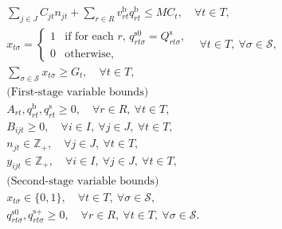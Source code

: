 \begin{subequations}
\begin{align}
	&\sum_{j\in J}C_{jt}n_{jt}+\sum_{r\in R}v_{rt}^\textrm{b}q_{rt}^\textrm{b}\le MC_t,\quad\forall t\in T,\label{chem:j}\\
	&x_{t\sigma}=\left\{ 
				\begin{array}{ll}
					1& \textrm{if for each $r$, $q_{rt\sigma}^\textrm{s0}=Q_{rt\sigma}^\textrm{s}$,}\\ 
					0& \textrm{otherwise,}
				\end{array}	
			\right. \quad\forall t\in T,\ \forall \sigma\in\mathcal{S}, \label{chem:k}\\
	&\sum_{\sigma\in\mathcal{S}}x_{t\sigma}\ge G_t,\quad\forall t\in T,\label{chem:l}\\
	&\textrm{(First-stage variable bounds)} \nonumber\\	
	&A_{rt},q_{rt}^\textrm{b},q_{rt}^\textrm{s}\ge 0,\quad\forall r\in R,\ \forall t\in T,\label{chem:m}\\
	&B_{ijt}\ge 0,\quad\forall i\in I,\ \forall j\in J,\ \forall t\in T,\label{chem:n}\\
	&n_{jt}\in\mathbb{Z}_+,\quad\forall j\in J,\ \forall t\in T,\label{chem:o}\\
	&y_{ijt}\in\mathbb{Z}_+,\quad\forall i\in I,\ \forall j\in J,\ \forall t\in T,\label{chem:p}\\
	&\textrm{(Second-stage variable bounds)} \nonumber\\	
	&x_{t\sigma}\in \{0,1\},\quad \forall t\in T,\ \forall\sigma\in\mathcal{S},\\
	&q_{rt\sigma}^\textrm{s0},q_{rt\sigma}^\textrm{s+}\ge 0,\quad\forall r\in R,\ \forall t\in T,\ \forall \sigma\in\mathcal{S}.\label{chem:q}
	\end{align}
\end{subequations}

